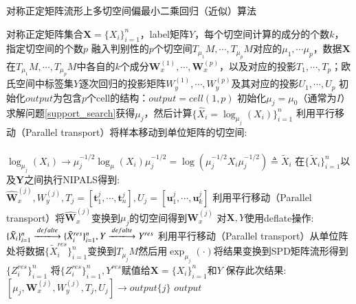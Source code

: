 \begin{algorithm}[htb]
\caption{对称正定矩阵流形上多切空间偏最小二乘回归（近似）算法}
\label{alg:RPLS_multi_support_approx_regression}
\begin{algorithmic}[1]
\REQUIRE 对称正定矩阵集合$\bm{X}=\{X_i\}_{i=1}^{n}$，label矩阵${Y}$，每个切空间计算的成分的个数$k$，指定切空间的个数$p$
\ENSURE 融入判别性的$p$个切空间$T_{\mu_1}M,\cdots,T_{\mu_{p}}M$对应的$\mu_{1},\cdots \mu_{p}$，数据$\bm{X}$在$T_{\mu_1}M,\cdots,T_{\mu_{p}}M$中各自的$k$个成分$\bm{W}_{x}^{(1)},\cdots,\bm{W}_{x}^{(p)}$，以及对应的投影$T_1,\cdots,T_{p}$；欧氏空间中标签集${Y}$逐次回归的投影矩阵$W_{y}^{(1)},\cdots,W_{y}^{(p)}$及其对应的投影$U_1,\cdots,U_{p}$
\STATE 初始化$output$为包含$p$个cell的结构：$output=cell(1,p)$
	\STATE 初始化$\mu_j=\mu_0$（通常为$I$）求解问题\ref{support_search}获得$\mu_j$，然后计算$\{\hat{X}_i=\log_{\mu_j}(X_i)\}_{i=1}^{n}$
	\STATE 利用平行移动（Parallel transport\cite{RCCA}）将样本移动到单位矩阵的切空间:\\
 	~~~~~~~~~~~~~~~~~~~~$\log_{\mu_{j}}(X_i)\rightarrow \mu_{j}^{-1/2}\log_{\mu}(X_i)\mu_{j}^{-1/2}=\log(\mu_{j}^{-1/2}X_i\mu_{j}^{-1/2})\triangleq \tilde{X}_i$
	\STATE 在$\{\tilde{X}_{i}\}_{i=1}^{n}$以及$\bm{Y}$之间执行NIPALS\cite{pls_NIPALS}得到:\\
	$\hat{\bm{W}}_{x}^{(j)},W_{y}^{(j)},T_{j}=[\bm{t}_{1}^{j},\cdots,\bm{t}_{n}^{j}],U_j=[\bm{u}_{1}^{j},\cdots,\bm{u}_{k}^{j}]$
	\STATE 利用平行移动（Parallel transport\cite{RCCA}）将$\hat{\bm{W}}_{x}^{(j)}$变换到$\mu_{j}$的切空间得到$\bm{W}_{x}^{(j)}$
	\STATE 对$\bm{X},{Y}$使用deflate操作:$\{\tilde{X}_{i}\}_{i=1}^{n} \xlongrightarrow{defalte} \{\tilde{X}^{res}_{i}\}_{i=1}^{n},{Y}\xlongrightarrow{defalte} {Y}^{res}$
	\STATE 利用平行移动（Parallel transport\cite{RCCA}）从单位阵处将数据$\{\tilde{X}^{res}_{i}\}_{i=1}^{n}$变换到$T_{\mu_{j}}M$然后用$\exp_{\mu_{j}}(\cdot)$将结果变换到SPD矩阵流形得到$\{Z^{res}_{i}\}_{i=1}^{n}$
	\STATE 将$\{Z^{res}_{i}\}_{i=1}^{n},{Y^{res}}$赋值给$\bm{X}=\{X_i\}_{i=1}^{n}$和${Y}$
	\STATE 保存此次结果:$[\mu_{j},\bm{W}_{x}^{(j)},W_{y}^{(j)},T_{j},U_{j}]\rightarrow output\{j\}$
\ENDFOR
\RETURN $output$
\end{algorithmic}
\end{algorithm}

